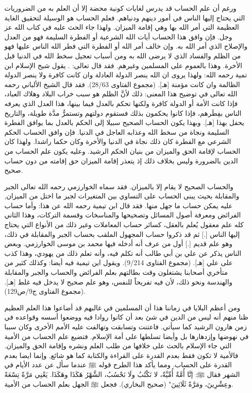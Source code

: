 ورغم أن علم الحساب قد يدرس لغايات كونية محضة إلا أن العلم به من الضروريات التي يحتاج إليها الناس في أمور دينهم ودنياهم. فعلم الحساب هو الوسيلة لتحقيق الغاية العظيمة التي أمر الله بها وهي إقامة الميزان. ولهذا جاء الحث عليه في كتاب الله عز وجل. فإن وافق هذا الحساب أيات الله الشرعية أو الفطرة السليمة فهو من العدل والإصلاح الذي أمر الله به. وإن خالف أمر الله أو الفطرة التي فطر الله الناس عليها فهو من الظلم والفساد الذي لا يرضى الله به ومن أسباب تعجيل سخط الله في الدنيا قبل الأخرة. وهذا بالعموم على المسلمين وغيرهم. فقد قال تعالى:
\quranayah*[11][117]{\footnotesize \surahname*[11]}.
يقول شيخ الإسلام ابن تمية رحمه الله:
ولهذا يروى ان الله ينصر الدولة العادلة وان كانت كافرة ولا ينصر الدولة الظالمة وان كانت مؤمنة
[هـ].
{\footnotesize (مجموع الفتاوى 28/63)}.
فقد قال الشيخ الألباني رحمه الله تعالى في توضيح هذا المعنى:
ذلك لأنَّ الظلم هو سبب خراب البلاد وهلاك العباد، فإذا كانت الأمة أو الدولة كافرة ولكنها تحكم بالعدل فيما بينها، هذا العدل الذي يعرفه الناس بفِطَرهم، فإذا كانوا يحكمون بذلك فستقوم دولتهم وتستمرُّ مدَّة طويلة، والتاريخ يحفل بهذا
[هـ].
وبهذا يكون الحساب الصحيح سبيلا إلى الحكم بالعدل بما يوافق الفطرة السليمة ونجاة من سخط الله وعذابه العاجل في الدنيا. فإن وافق الحساب الحكم الشرعي مع الفطرة كان ذلك نجاة في الدنيا والأخرة وكان حكما راشدا. ولهذا كان الحساب لإقامة الحق والميزان من بنيان الحكم الرشيد. وعليه يكون علم الحساب من الدين بالضرورة وليس بخلاف ذلك إذ يتعذر إقامة الميزان حق إقامته من دون حساب صحيح.

والحساب الصحيح لا يقام إلا بالميزان. فقد سماه الخوارزمي رحمه الله تعالى الجبر والمقابلة بحيث يبنى الحساب على التساوي بين المتغيرات لجبر ما اختل من الميزان, عليه يمكن حساب ما جهل منها. فقد قال ابن تيمية رحمه الله عن هذا:
وأما حساب الفرائض ومعرفة أصول المسائل وتصحيحها والمناسخات وقسمة التركات، وهذا الثاني كله علم معقول يُعلم بالعقل، كسائر حساب المعاملات وغير ذلك من الأنواع التي يحتاج إليها الناس [.] ثم قد ذكروا حساب المجهول الملقب بحساب الجبر والمقابلة في ذلك، وهو علم قديم [.] أول من عرف أنه أدخله فيها محمد بن موسى الخوارزمي. وبعض الناس يذكر عن علي بن أبي طالب أنه تكلم فيه، وأنه تعلم ذلك من يهودي، وهذا كذب على علي
[هـ].
{\footnotesize (مجموع الفتاوى 9/214)}.
ويقول اين تيمية فيه أيضا:
وكذلك كثير من متأخري أصحابنا يشتغلون وقت بطالتهم بعلم الفرائض والحساب والجبر والمقابلة والهندسة ونحو ذلك، لأن فيه تفريحاً للنفس، وهو علم صحيح لا يدخل فيه غلط
[هـ].
{\footnotesize (مجموع الفتاوى ج9/ص129)}.

ومن أعظم البلايا في زماننا هذا أن المسلمين في غالبهم قد أضاعوا هذا العلم العظيم ظنا منهم أنه ليس من الدين في شئ بعد أن كانوا روادا فيه ووضعوا أسسه وقواعده في زمن هارون الرشيد كما سيأتي. فاعتنت وتسابقت وتهالفت عليه الأمم الأخرى وكان سببا في نهوضها وإزدهارها بل وأيضا تسلطها على أمة الإسلام. فتضيع علم الحساب من الأمية التي جاء الإسلام بالحث على خلافها من طلب العلم ونشره وإقامة الحق والميزان. فالأمية لا تكون فقط بعدم القدرة على القراءة والكتابة كما هو شائع, وإنما ايضا بعدم القدرة على الحساب.
ومما يأكد هذا الطرح قوله ﷺ عندما سأل عن عدد الأيام في الشهر فقال ﷺ:
إنَّا أُمَّةٌ أُمِّيَّةٌ، لا نَكْتُبُ ولَا نَحْسُبُ، الشَّهْرُ هَكَذَا وهَكَذَا. يَعْنِي مَرَّةً تِسْعَةً وعِشْرِينَ، ومَرَّةً ثَلَاثِينَ"
{\footnotesize (صحيح البخاري)}.
فجعل ﷺ الجهل بعلم الحساب من الأمية.

